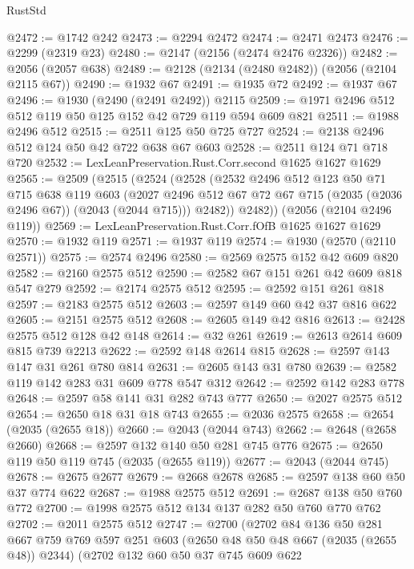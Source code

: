 \begin{lexlean}{RustStd}
\begin{coremodule}
@2472 := @1742 @242
@2473 := @2294 @2472
@2474 := @2471 @2473
@2476 := @2299 (@2319 @23)
@2480 := @2147 (@2156 (@2474 @2476 @2326))
@2482 := @2056 (@2057 @638)
@2489 := @2128 (@2134 (@2480 @2482)) (@2056 (@2104 @2115 @67))
@2490 := @1932 @67
@2491 := @1935 @72
@2492 := @1937 @67
@2496 := @1930 (@2490 (@2491 @2492)) @2115
@2509 := @1971 @2496 @512 @512 @119 @50 @125 @152 @42 @729 @119 @594 @609 @821
@2511 := @1988 @2496 @512
@2515 := @2511 @125 @50 @725 @727
@2524 := @2138 @2496 @512 @124 @50 @42 @722 @638 @67 @603
@2528 := @2511 @124 @71 @718 @720
@2532 := LexLeanPreservation.Rust.Corr.second @1625 @1627 @1629
@2565 := @2509
    (@2515
      (@2524
        (@2528
          (@2532
            @2496
            @512
            @123
            @50
            @71
            @715
            @638
            @119
            @603
            (@2027 @2496 @512 @67 @72 @67 @715 (@2035 (@2036 @2496 @67)) (@2043 (@2044 @715)))
            @2482))
        @2482))
    (@2056 (@2104 @2496 @119))
@2569 := LexLeanPreservation.Rust.Corr.fOfB @1625 @1627 @1629
@2570 := @1932 @119
@2571 := @1937 @119
@2574 := @1930 (@2570 (@2110 @2571))
@2575 := @2574 @2496
@2580 := @2569 @2575 @152 @42 @609 @820
@2582 := @2160 @2575 @512
@2590 := @2582 @67 @151 @261 @42 @609 @818 @547 @279
@2592 := @2174 @2575 @512
@2595 := @2592 @151 @261 @818
@2597 := @2183 @2575 @512
@2603 := @2597 @149 @60 @42 @37 @816 @622
@2605 := @2151 @2575 @512
@2608 := @2605 @149 @42 @816
@2613 := @2428 @2575 @512 @128 @42 @148
@2614 := @32 @261
@2619 := @2613 @2614 @609 @815 @739 @2213
@2622 := @2592 @148 @2614 @815
@2628 := @2597 @143 @147 @31 @261 @780 @814
@2631 := @2605 @143 @31 @780
@2639 := @2582 @119 @142 @283 @31 @609 @778 @547 @312
@2642 := @2592 @142 @283 @778
@2648 := @2597 @58 @141 @31 @282 @743 @777
@2650 := @2027 @2575 @512
@2654 := @2650 @18 @31 @18 @743
@2655 := @2036 @2575
@2658 := @2654 (@2035 (@2655 @18))
@2660 := @2043 (@2044 @743)
@2662 := @2648 (@2658 @2660)
@2668 := @2597 @132 @140 @50 @281 @745 @776
@2675 := @2650 @119 @50 @119 @745 (@2035 (@2655 @119))
@2677 := @2043 (@2044 @745)
@2678 := @2675 @2677
@2679 := @2668 @2678
@2685 := @2597 @138 @60 @50 @37 @774 @622
@2687 := @1988 @2575 @512
@2691 := @2687 @138 @50 @760 @772
@2700 := @1998 @2575 @512 @134 @137 @282 @50 @760 @770 @762
@2702 := @2011 @2575 @512
@2747 := @2700
    (@2702
      @84
      @136
      @50
      @281
      @667
      @759
      @769
      @597
      @251
      @603
      (@2650 @48 @50 @48 @667 (@2035 (@2655 @48)) @2344)
      (@2702
        @132
        @60
        @50
        @37
        @745
        @609
        @622

\end{coremodule}
\end{lexlean}
